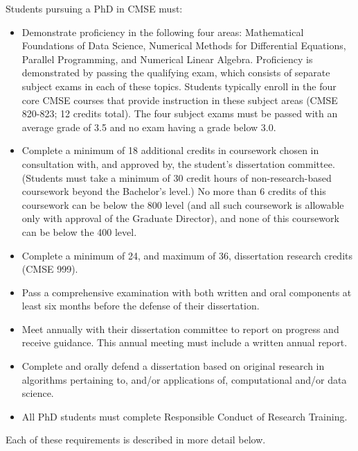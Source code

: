 Students pursuing a PhD in CMSE must:

\begin{itemize}
\item  Demonstrate proficiency in the following four areas:
  Mathematical Foundations of Data Science, Numerical Methods for
  Differential Equations, Parallel Programming, and Numerical Linear
  Algebra.  Proficiency is demonstrated by passing the qualifying
  exam, which consists of separate subject exams in each of these
  topics.  Students typically enroll in the four core CMSE courses
  that provide instruction in these subject areas (CMSE 820-823; 12
  credits total).  The four subject exams must be passed with an
  average grade of 3.5 and no exam having a grade below 3.0.

\item Complete a minimum of 18 additional credits in coursework
  chosen in consultation with, and approved by, the student’s
  dissertation committee.  (Students must take a minimum of 30 credit
  hours of non-research-based coursework beyond the Bachelor's level.)
  No more than 6 credits of this coursework can be below the 800 level
  (and all such coursework is allowable only with approval of the
  Graduate Director), and none of this coursework can be below the 400
  level.

\item Complete a minimum of 24, and maximum of 36, dissertation
  research credits (CMSE 999).

\item Pass a comprehensive examination with both written and oral
  components at least six months before the defense of their
  dissertation.

\item Meet annually with their dissertation committee to report on
  progress and receive guidance.  This annual meeting must include a
  written annual report.

\item Complete and orally defend a dissertation based on original
  research in algorithms pertaining to, and/or applications of,
  computational and/or data science.  

\item All PhD students must complete Responsible Conduct of Research
  Training.  

\end{itemize}

Each of these requirements is described in more detail below.

